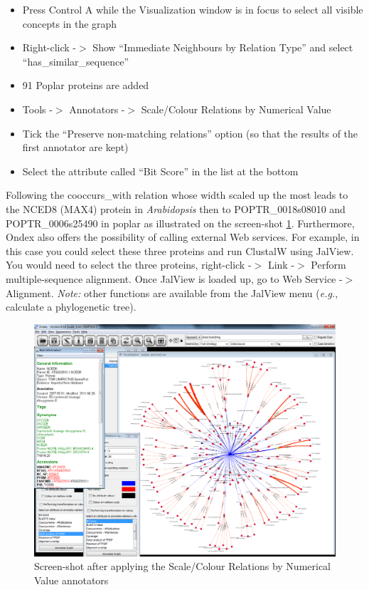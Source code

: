 \begin{itemize}
\item Press Control A while the Visualization window is in focus to select all visible concepts in the graph
\item Right-click -$>$ Show ``Immediate Neighbours by Relation Type'' and select ``has\_similar\_sequence''
\item 91 Poplar proteins are added
\item Tools -$>$ Annotators -$>$ Scale/Colour Relations by Numerical Value
\item Tick the ``Preserve non-matching relations'' option (so that the results of the first annotator are kept)
\item Select the attribute called ``Bit Score'' in the list at the bottom
\end{itemize}

Following the cooccurs\_with relation whose width scaled up the most leads to the NCED8 (MAX4) protein in {\it{Arabidopsis}} then to POPTR\_0018s08010 and POPTR\_0006s25490 in poplar as illustrated on the screen-shot \ref{fig:poplar_ex2_searchresAnno}.
Furthermore, Ondex also offers the possibility of calling external Web services.
For example, in this case you could select these three proteins and run ClustalW using JalView.
You would need to select the three proteins, right-click -$>$ Link -$>$  Perform multiple-sequence alignment.
Once JalView is loaded up, go to Web Service -$>$ Alignment. 
\emph{Note:} other functions are available from the JalView menu ({\it{e.g.}}, calculate a phylogenetic tree).

\begin{figure}[H]
\centering
\includegraphics[scale=0.3]{images/Jun12/poplar_ex2_searchresAnno.png} 
\caption{Screen-shot after applying the Scale/Colour Relations by Numerical Value annotators}
\label{fig:poplar_ex2_searchresAnno}
\end{figure}
